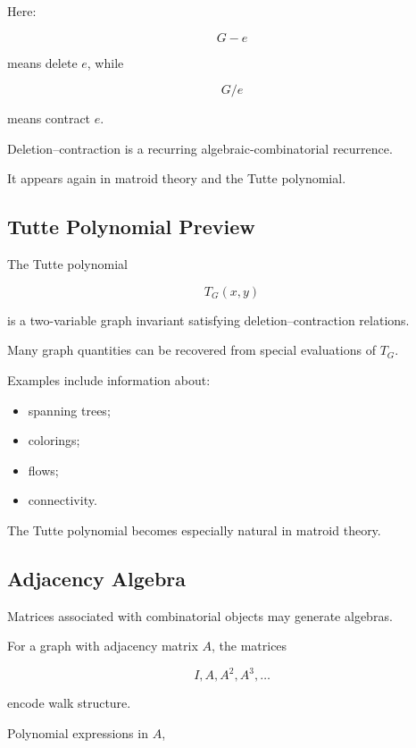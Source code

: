 Here:

\[
G-e
\]

means delete \(e\), while

\[
G/e
\]

means contract \(e\).

Deletion--contraction is a recurring algebraic-combinatorial recurrence.

It appears again in matroid theory and the Tutte polynomial.

\subsection{Tutte Polynomial Preview}
\label{subsec:tutte-polynomial-preview}

The Tutte polynomial

\[
\boxed{
T_G(x,y)
}
\]

is a two-variable graph invariant satisfying deletion--contraction
relations.

Many graph quantities can be recovered from special evaluations of
\(T_G\).

Examples include information about:

\begin{itemize}
    \item spanning trees;
    \item colorings;
    \item flows;
    \item connectivity.
\end{itemize}

The Tutte polynomial becomes especially natural in matroid theory.

\subsection{Adjacency Algebra}
\label{subsec:adjacency-algebra}

Matrices associated with combinatorial objects may generate algebras.

For a graph with adjacency matrix \(A\), the matrices

\[
I,A,A^2,A^3,\ldots
\]

encode walk structure.

Polynomial expressions in \(A\),


